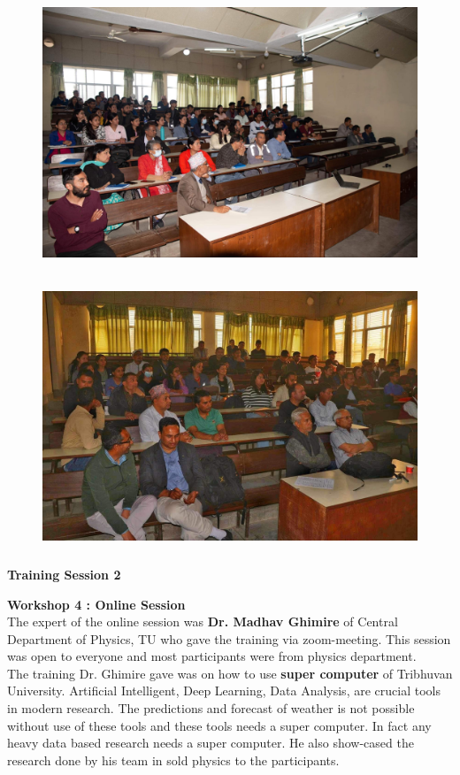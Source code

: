 \documentclass[a4paper,12pt]{report}
\begin{document}
\begin{figure}[h!]
  \centering
  \includegraphics[width=13cm, height=8cm]{ss.jpeg}
\end{figure}

\vspace{10mm}

\begin{figure}[h!]
  \centering
  \includegraphics[width=13cm, height=8cm]{r.jpeg}
\end{figure}
\clearpage

\begin{center}
  {\bfseries \Large Training Session 2}
\end{center}
\vspace{5mm}

{\bfseries \large Workshop 4 : Online Session}\\[3mm]
The expert of the online session was \textbf{Dr. Madhav Ghimire} of Central Department of Physics, TU who gave the training via zoom-meeting. This session was open to everyone and most participants were from physics department.\\[3mm]
The training Dr. Ghimire gave was on how to use \textbf{super computer} of Tribhuvan University. Artificial Intelligent, Deep Learning, Data Analysis, are crucial tools in modern research. The predictions and forecast of weather is not possible without use of these tools and these tools needs a super computer. In fact any heavy data based research needs a super computer. He also show-cased the research done by his team in sold physics to the participants.
\end{document}
